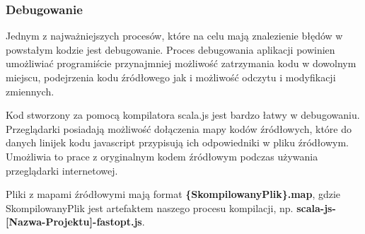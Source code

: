 \subsubsection{Debugowanie}


Jednym z najważniejszych procesów, które na celu mają znalezienie błędów w powstałym kodzie jest debugowanie. Proces debugowania aplikacji powinien umożliwiać programiście przynajmniej możliwość zatrzymania kodu w dowolnym miejscu, podejrzenia kodu źródłowego jak i możliwość odczytu i modyfikacji zmiennych.

Kod stworzony za pomocą kompilatora scala.js jest bardzo łatwy w debugowaniu. Przeglądarki posiadają możliwość dołączenia mapy kodów źródłowych, które do danych linijek kodu javascript przypisują ich odpowiedniki w pliku źródłowym. Umożliwia to prace z oryginalnym kodem źródłowym podczas używania przeglądarki internetowej. 

Pliki z mapami źródłowymi mają format \textbf{\{SkompilowanyPlik\}.map}, gdzie SkompilowanyPlik jest artefaktem naszego procesu kompilacji, np.  \textbf{scala-js-[Nazwa-Projektu]-fastopt.js}. 


